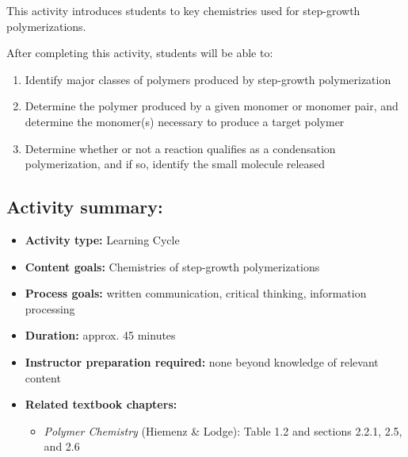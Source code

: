 %
%
%
%

\renewcommand{\figpath}{content/polymchem/stepgrowth/stepgrowth-chemistries/figs}
\renewcommand{\labelbase}{stepgrowth-chem}

\begin{activity}

\begin{instructornotes}

	This activity introduces students to key chemistries used for step-growth polymerizations.
	
	After completing this activity, students will be able to:
			\begin{enumerate}
				\item Identify major classes of polymers produced by step-growth polymerization
				\item Determine the polymer produced by a given monomer or monomer pair, and determine the monomer(s) necessary to produce a target polymer
				\item Determine whether or not a reaction qualifies as a condensation polymerization, and if so, identify the small molecule released
			\end{enumerate}
	
			
	\subsection*{Activity summary:}
	\begin{itemize}
		\item \textbf{Activity type:} Learning Cycle
		\item \textbf{Content goals:} Chemistries of step-growth polymerizations
		\item \textbf{Process goals:} %
			written communication, critical thinking, information processing
		\item \textbf{Duration:} approx. 45 minutes
		\item \textbf{Instructor preparation required:} none beyond knowledge of relevant content
		\item \textbf{Related textbook chapters:}
			\begin{itemize}
				\item \emph{Polymer Chemistry} (Hiemenz \& Lodge): Table 1.2 and sections 2.2.1, 2.5, and 2.6
			\end{itemize}
	\end{itemize}


\end{instructornotes}
\end{activity}
